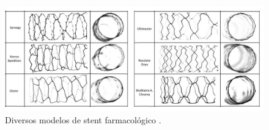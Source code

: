 \begin{figure}[H]
  \centering
  \includegraphics[scale=0.66]{./02_chaps/cap_review/figure/stent_drug.jpg}
 \caption{Diversos modelos de stent farmacológico \cite{stent2016}.}
 \label{stent drug}
\end{figure}

